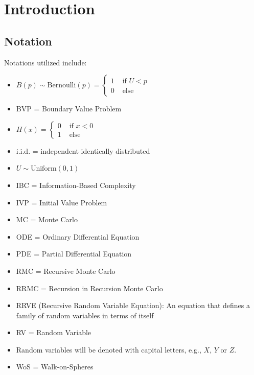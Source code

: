 \documentclass[a4paper,12pt]{article}
\begin{document}


\newpage
\tableofcontents
\newpage

\begin{abstract}
    
\end{abstract}


\section{Introduction}


\subsection{Notation}
Notations utilized include:

\begin{itemize}
    \item $B(p) \sim \text{Bernoulli}(p) =
              \begin{cases}
                  1 & \text{ if } U<p \\
                  0 & \text{ else }
              \end{cases} $
    \item BVP = Boundary Value Problem
    \item $ H(x) =
              \begin{cases}
                  0 & \text{ if } x<0 \\
                  1 & \text{ else }
              \end{cases}$
    \item i.i.d. = independent identically distributed
    \item $U \sim \text{Uniform}(0,1)$
    \item IBC = Information-Based Complexity
    \item IVP = Initial Value Problem
    \item MC = Monte Carlo
    \item ODE = Ordinary Differential Equation
    \item PDE = Partial Differential Equation
    \item RMC = Recursive Monte Carlo
    \item RRMC = Recursion in Recursion Monte Carlo
    \item RRVE (Recursive Random Variable Equation): An equation that defines a
          family of random variables in terms of itself
    \item RV = Random Variable
    \item Random variables will be denoted with capital letters, e.g., $X$, $Y$ or $Z$.
    \item WoS = Walk-on-Spheres
\end{itemize}
\end{document}
